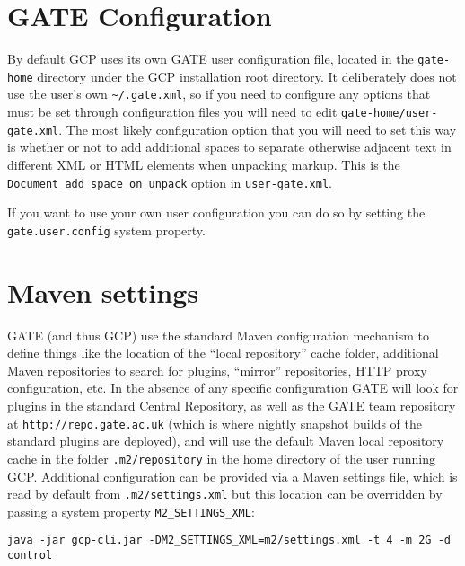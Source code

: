 \section{GATE Configuration}

By default GCP uses its own GATE user configuration file, located in the
\verb!gate-home! directory under the GCP installation root directory.  It
deliberately does not use the user's own \verb!~/.gate.xml!, so if you need to
configure any options that must be set through configuration files you will
need to edit \verb!gate-home/user-gate.xml!.  The most likely configuration
option that you will need to set this way is whether or not to add additional
spaces to separate otherwise adjacent text in different XML or HTML elements
when unpacking markup.  This is the \verb!Document_add_space_on_unpack! option
in \verb!user-gate.xml!.

If you want to use your own user configuration you can do so by setting the
\verb|gate.user.config| system property.

\section{Maven settings}\label{sec:maven-settings}

GATE (and thus GCP) use the standard Maven configuration mechanism to define
things like the location of the ``local repository'' cache folder, additional
Maven repositories to search for plugins, ``mirror'' repositories, HTTP proxy
configuration, etc.  In the absence of any specific configuration GATE will
look for plugins in the standard Central Repository, as well as the GATE team
repository at \verb!http://repo.gate.ac.uk! (which is where nightly snapshot
builds of the standard plugins are deployed), and will use the default Maven
local repository cache in the folder \verb!.m2/repository! in the home
directory of the user running GCP.  Additional configuration can be provided
via a Maven settings file, which is read by default from
\verb!.m2/settings.xml! but this location can be overridden by passing a system
property \verb!M2_SETTINGS_XML!:
\begin{lstlisting}[breaklines]
java -jar gcp-cli.jar -DM2_SETTINGS_XML=m2/settings.xml -t 4 -m 2G -d control
\end{lstlisting}

